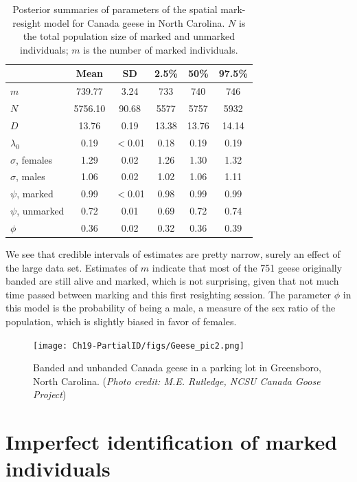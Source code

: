 \begin{table}
\label{partialID.tab.geese}
\centering
  \caption{Posterior summaries of parameters of the spatial mark-resight model for Canada geese in North Carolina. $N$ is the total population size of marked and unmarked individuals; $m$ is the number of marked individuals.}
  \begin{tabular}{lccccc}
             \hline
                  & Mean    & SD      & 2.5\% & 50\%  & 97.5\% \\
           \hline
$m$               & 739.77  & 3.24    & 733   & 740   & 746    \\
$N$               & 5756.10 & 90.68   & 5577  & 5757  & 5932   \\
$D$               & 13.76   & 0.19    & 13.38 & 13.76 & 14.14  \\
$\lambda_0$       & 0.19    & $<$0.01 & 0.18  & 0.19  & 0.19   \\
$\sigma$, females & 1.29    & 0.02    & 1.26  & 1.30  & 1.32   \\
$\sigma$, males   & 1.06    & 0.02    & 1.02  & 1.06  & 1.11   \\
$\psi$, marked    & 0.99    & $<$0.01 & 0.98  & 0.99  & 0.99   \\
$\psi$, unmarked  & 0.72    & 0.01    & 0.69  & 0.72  & 0.74   \\
$\phi$            & 0.36    & 0.02    & 0.32  & 0.36  & 0.39   \\
    \hline
  \end{tabular}
\end{table}

We see that credible intervals of estimates are pretty narrow, surely an effect of the large data set. Estimates of $m$ indicate that most of the 751 geese originally banded are still alive and marked, which is not surprising, given that not much time passed between marking and this first resighting session. The parameter $\phi$ in this model is the probability of being a male, a measure of the sex ratio of the population, which is slightly biased in favor of females.

\begin{figure}[ht]
  \centering
  \texttt{[image: Ch19-PartialID/figs/Geese\_pic2.png]}
  \caption{Banded and unbanded Canada geese in a parking lot in Greensboro, North Carolina.
({\it Photo credit: M.E. Rutledge, NCSU Canada Goose Project})}
  \label{partialID.fig.geese}
\end{figure}


\section  {Imperfect identification of marked individuals}
\label{partialID.sec.IDrate}

